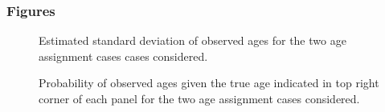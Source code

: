 \documentclass[11pt]{book}
\begin{document}
\hypertarget{figures}{%
\subsubsection{Figures}\label{figures}}
\begin{figure}[htb]

{\centering {} 

}

\caption{Estimated standard deviation of observed ages for the two age assignment cases cases considered.}\label{fig:unnamed-chunk-5}
\end{figure}
\newpage
\begin{figure}[htb]

{\centering {} 

}

\caption{Probability of observed ages given the true age indicated in top right corner of each panel for the two age assignment cases considered.}\label{fig:unnamed-chunk-6}
\end{figure}
\end{document}
